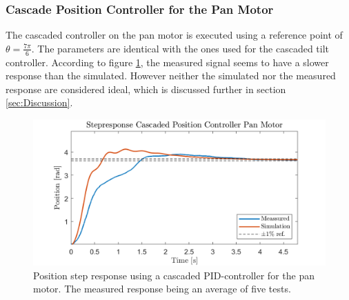 \documentclass[../../main.tex]{subfiles}
\begin{document}
\subsubsection*{Cascade Position Controller for the Pan Motor}
The cascaded controller on the pan motor is executed using a reference point of $\theta = \frac{7\pi}{6}$. The parameters are identical with the ones used for the cascaded tilt controller. According to figure \ref{fig:cascade_ZN_pan}, the measured signal seems to have a slower response than the simulated. However neither the simulated nor the measured response are considered ideal, which is discussed further in section \ref{sec:Discussion}.

\begin{figure}[h]
    \centering
    \includegraphics[width = 0.7 \textwidth]{Sections/Test/Images/cascade_ZN_pan.png}
    \caption{Position step response using a cascaded PID-controller for the pan motor. The measured response being an average of five tests.}
    \label{fig:cascade_ZN_pan}
\end{figure}
\end{document}
